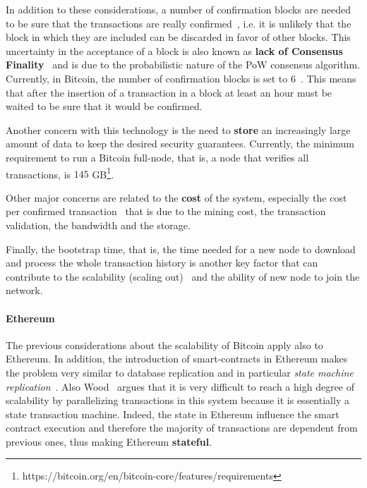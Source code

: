 In addition to these considerations, a number of confirmation blocks are needed
to be sure that the transactions are really confirmed~\cite{bib:taxonomy}, i.e.
it is unlikely that the block in which they are included can be discarded in
favor of other blocks. This uncertainty in the acceptance of a block is also
known as \textbf{lack of Consensus Finality}~\cite{bib:the-quest} and is due to
the probabilistic nature of the PoW consensus algorithm. Currently, in Bitcoin,
the number of confirmation blocks is set to $6$~\cite{bib:masteringbitcoin}.
This means that after the insertion of a transaction in a block at least an hour
must be waited to be sure that it would be confirmed.

Another concern with this technology is the need to \textbf{store} an
increasingly large amount of data to keep the desired security guarantees.
Currently, the minimum requirement to run a Bitcoin full-node, that is, a node
that verifies all transactions, is $145$
GB\footnote{https://bitcoin.org/en/bitcoin-core/features/requirements}.

Other major concerns are related to the \textbf{cost} of the system, especially
the cost per confirmed transaction~\cite{bib:scaling-croman} that is due to the
mining cost, the transaction validation, the bandwidth and the storage.

Finally, the bootstrap time, that is, the time needed for a new node to download
and process the whole transaction history is another key factor that can
contribute to the scalability (scaling out)~\cite{bib:scaling-croman} and the
ability of new node to join the network.

\paragraph{Ethereum} The previous considerations about the scalability of
Bitcoin apply also to Ethereum. In addition, the introduction of
smart-contracts in Ethereum makes the problem very similar to database
replication and in particular \emph{state machine
replication}~\cite{bib:the-quest}. Also Wood~\cite{wood2018ethereum} argues
that  it is very difficult to reach a high degree of scalability by
parallelizing transactions in this system because it is essentially a state
transaction machine. Indeed, the state in Ethereum influence the smart contract
execution and therefore the majority of transactions are dependent from
previous ones, thus making Ethereum \textbf{stateful}.




